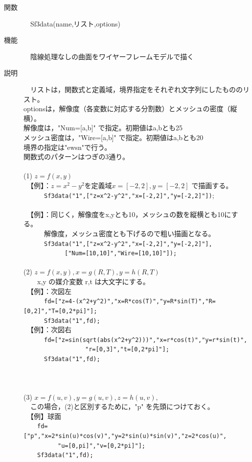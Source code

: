 \documentclass[papersize,a4paper,12pt,uplatex]{jsarticle}
\begin{document}
\begin{description}
\hypertarget{sf3data}{}
\item[関数]　Sf3data(name,リスト,options)
\item[機能]　陰線処理なしの曲面をワイヤーフレームモデルで描く
\item[説明]　リストは，関数式と定義域，境界指定をそれぞれ文字列にしたもののリスト。\\
optionsは，解像度（各変数に対応する分割数）とメッシュの密度（縦横）。\\
解像度は，"Num=[a,b]" で指定。初期値はa,bとも25\\
メッシュ密度は，"Wire=[a,b]" で指定。初期値はa,bとも20\\
境界の指定は"ewsn"で行う。\\
関数式のパターンはつぎの3通り。\\
　\\
(1) $z=f(x,y)$\\
　【例】：$z=x^2-y^2$を定義域$x=[-2,2],y=[-2,2]$ で描画する。\\
　　　\verb|Sf3data("1",["z=x^2-y^2","x=[-2,2]","y=[-2,2]"])|;\\
　　　　　　　\\
　【例】：同じく，解像度をx,yとも10，メッシュの数を縦横とも10にする。\\
　　　解像度，メッシュ密度とも下げるので粗い描画となる。\\
　　　\verb|Sf3data("1",["z=x^2-y^2","x=[-2,2]","y=[-2,2]"],|\\
　　　　　　\verb|["Num=[10,10]","Wire=[10,10]"]);|\\
　\\
(2) $z=f(x,y),x=g(R,T),y=h(R,T)$\\
　　x,y の媒介変数 r,t は大文字にする。\\
　【例】：次図左\\
　　　\verb|fd=["z=4-(x^2+y^2)","x=R*cos(T)","y=R*sin(T)","R=[0,2]","T=[0,2*pi]"];|\\
　　　\verb|Sf3data("1",fd);|\\
　【例】：次図右\\
　　　\verb|fd=["z=sin(sqrt(abs(x^2+y^2)))","x=r*cos(t)","y=r*sin(t)",|\\
　　　　　　　　　\verb|"r=[0,3]","t=[0,2*pi]"];|\\
　　　\verb|Sf3data("1",fd);|\\
\\
　　　\\
\\
(3) $x=f(u,v),y=g(u,v),z=h(u,v),$\\
　この場合，(2)と区別するために，"p" を先頭につけておく。\\
　【例】球面\\
　　\verb|fd=["p","x=2*sin(u)*cos(v)","y=2*sin(u)*sin(v)","z=2*cos(u)",|\\
　　　　　\verb|"u=[0,pi]","v=[0,2*pi]"];|\\
　　\verb|Sf3data("1",fd);|\\


\end{description}
\end{document}
